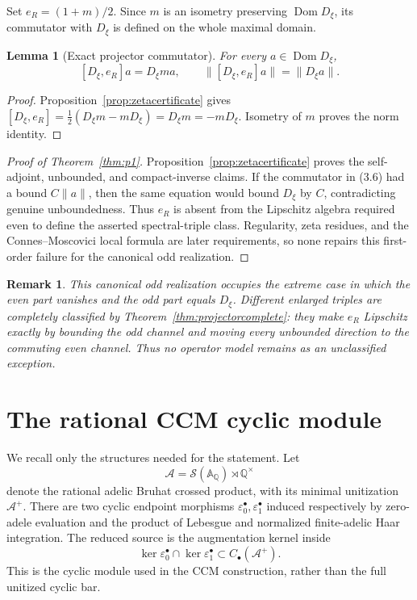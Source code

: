 \documentclass[11pt,reqno]{amsart}
\newtheorem{lemma}[theorem]{Lemma}
\newtheorem{remark}[theorem]{Remark}
\newcommand{\Q}{\mathbb Q}
\newcommand{\A}{\mathbb A}
\newcommand{\Dom}{\operatorname{Dom}}
\newcommand{\eps}{\varepsilon}
\newcommand{\cS}{\mathcal S}
\newcommand{\cA}{\mathcal A}
\begin{document}
Set $e_R=(1+m)/2$.  Since $m$ is an isometry preserving $\Dom D_\xi$, its commutator with
$D_\xi$ is defined on the whole maximal domain.

\begin{lemma}[Exact projector commutator]\label{lem:projectorcommutator}
For every $a\in\Dom D_\xi$,
\[
                 [D_\xi,e_R]a=D_\xi ma,
        \qquad \|[D_\xi,e_R]a\|=\|D_\xi a\|.          \tag{3.6}
\]
\end{lemma}

\begin{proof}
Proposition~\ref{prop:zetacertificate} gives
$[D_\xi,e_R]=\frac12(D_\xi m-mD_\xi)=D_\xi m=-mD_\xi$.  Isometry of $m$ proves the norm
identity.
\end{proof}

\begin{proof}[Proof of Theorem~\ref{thm:p1}]
Proposition~\ref{prop:zetacertificate} proves the self-adjoint, unbounded, and compact-inverse
claims.  If the commutator in (3.6) had a bound $C\|a\|$, then the same equation would bound
$D_\xi$ by $C$, contradicting genuine unboundedness.  Thus $e_R$ is absent from the Lipschitz
algebra required even to define the asserted spectral-triple class.  Regularity, zeta residues,
and the Connes--Moscovici local formula are later requirements, so none repairs this first-order
failure for the canonical odd realization.
\end{proof}

\begin{remark}
This canonical odd realization occupies the extreme case in which the even part vanishes and the
odd part equals $D_\xi$.  Different enlarged triples are completely
classified by Theorem~\ref{thm:projectorcomplete}: they make $e_R$ Lipschitz exactly by bounding
the odd channel and moving every unbounded direction to the commuting even channel.  Thus no
operator model remains as an unclassified exception.
\end{remark}

\section{The rational CCM cyclic module}\label{sec:ccm}

We recall only the structures needed for the statement.  Let
\[
       \cA=\cS(\A_\Q)\rtimes\Q^\times                \tag{4.1}
\]
denote the rational adelic Bruhat crossed product, with its minimal unitization $\cA^+$.  There are
two cyclic endpoint morphisms $\eps_0^\bullet,\eps_1^\bullet$ induced respectively by zero-adele
evaluation and the product of Lebesgue and normalized finite-adelic Haar integration.  The reduced
source is the augmentation kernel inside
\[
  \ker\eps_0^\bullet\cap\ker\eps_1^\bullet
       \subset C_\bullet(\cA^+).                     \tag{4.2}
\]
This is the cyclic module used in the CCM construction, rather than the full unitized cyclic bar.
\end{document}
